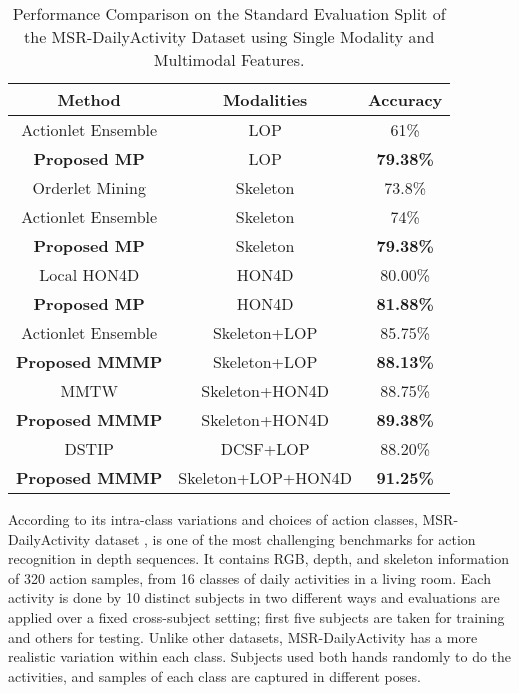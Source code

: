 \documentclass[9pt,technote,compsoc]{IEEEtran}
\begin{document}
\begin{table}[!t]
	\renewcommand{\arraystretch}{1.3}
	\caption{Performance Comparison on the Standard Evaluation Split of the MSR-DailyActivity Dataset using Single Modality and Multimodal Features.}
	\label{table_msrdailyactivity}
	\centering
	\begin{tabular}{|c|c||c|}
		\hline
		\bfseries Method & \bfseries Modalities & \bfseries Accuracy
		\\\hline\hline
		Actionlet Ensemble \cite{actionletPAMI} & LOP & 61\%\\
		\hline
		{\bf Proposed MP} & LOP &{\bf 79.38\%}\\
		\hline\hline
		Orderlet Mining \cite{Orderlet} & Skeleton & 73.8\%\\
		\hline
		Actionlet Ensemble \cite{actionletPAMI} & Skeleton & 74\%\\
		\hline
		{\bf Proposed MP} & Skeleton & {\bf 79.38\%}\\
		\hline\hline
		Local HON4D \cite{HON4D} & HON4D & 80.00\%\\
		\hline
		{\bf Proposed MP} & HON4D &{\bf 81.88\%}\\
		\hline\hline
		Actionlet Ensemble \cite{actionletPAMI} & Skeleton+LOP & 85.75\%\\
		\hline
		{\bf Proposed MMMP} & Skeleton+LOP & {\bf 88.13\%}\\
		\hline\hline
		MMTW \cite{MMTW} & Skeleton+HON4D & 88.75\%\\
		\hline
		{\bf Proposed MMMP}& Skeleton+HON4D & {\bf 89.38\% }\\
		\hline\hline
		DSTIP \cite{xiaCVPR13spatio} & DCSF+LOP & 88.20\%\\
		\hline\hline
		{\bf Proposed MMMP}& Skeleton+LOP+HON4D & {\bf 91.25\% }\\
		\hline
	\end{tabular}
\end{table}

According to its intra-class variations and choices of action classes, MSR-DailyActivity dataset \cite{actionletPAMI}, is one of the most challenging benchmarks for action recognition in depth sequences. It contains RGB, depth, and skeleton information of 320 action samples, from 16 classes of daily activities in a living room. Each activity is done by 10 distinct subjects in two different ways and evaluations are applied over a fixed cross-subject setting; first five subjects are taken for training and others for testing. Unlike other datasets, MSR-DailyActivity has a more realistic variation within each class. Subjects used both hands randomly to do the activities, and samples of each class are captured in different poses.
\end{document}
